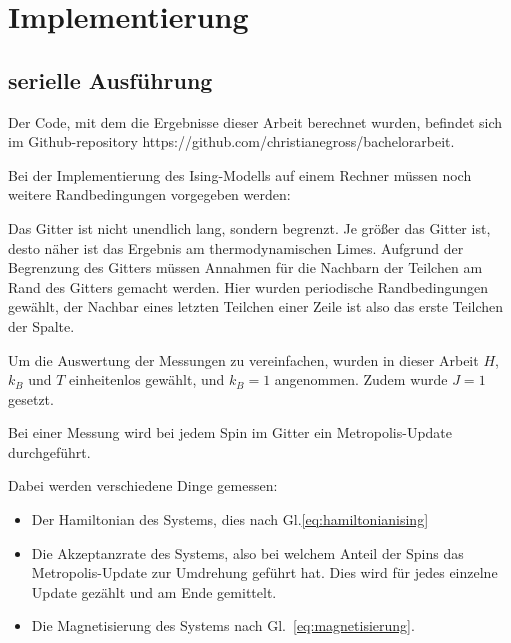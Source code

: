 	\chapter{Implementierung}
	\label{chap:implementierung}
	
	\section{serielle Ausführung}
	\label{sec:seriellimplementierung}
	
	Der Code, mit dem die Ergebnisse dieser Arbeit berechnet wurden, befindet sich im Github-repository https://github.com/christianegross/bachelorarbeit. %
	
	Bei der Implementierung des Ising-Modells auf einem Rechner müssen noch weitere Randbedingungen vorgegeben werden:
	
	Das Gitter ist nicht unendlich lang, sondern begrenzt. Je größer das Gitter ist, desto näher ist das Ergebnis am thermodynamischen Limes. 
	Aufgrund der Begrenzung des Gitters müssen Annahmen für die Nachbarn der Teilchen am Rand des Gitters gemacht werden. Hier wurden periodische Randbedingungen gewählt, der Nachbar eines letzten Teilchen einer Zeile ist also das erste Teilchen der Spalte.
	
	Um die Auswertung der Messungen zu vereinfachen, wurden in dieser Arbeit $H$, $k_B$ und $T$ einheitenlos gewählt, und $k_B=1$ angenommen. Zudem wurde $J=1$ gesetzt.
	
	Bei einer Messung wird bei jedem Spin im Gitter ein Metropolis-Update durchgeführt.%
	
	Dabei werden verschiedene Dinge gemessen: \begin{itemize}
		\item Der Hamiltonian des Systems, dies nach Gl.\ref{eq:hamiltonianising}
		\item Die Akzeptanzrate des Systems, also bei welchem Anteil der Spins das Metropolis-Update zur Umdrehung geführt hat. Dies wird für jedes einzelne Update gezählt und am Ende gemittelt.
		\item Die Magnetisierung des Systems nach Gl.~\ref{eq:magnetisierung}. 
	\end{itemize}
	
